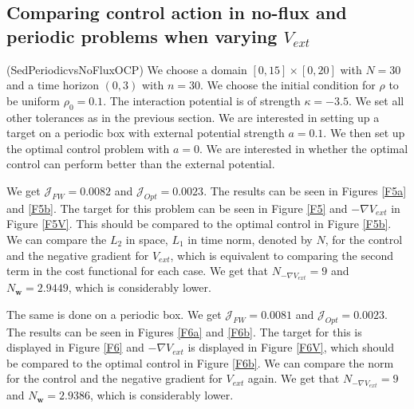 \documentclass[11pt, a4paper]{article}
\theoremstyle{definition}
\newcommand{\w}{\mathbf{w}}
\begin{document}
\subsection{Comparing control action in no-flux and periodic problems when varying $V_{ext}$} \label{sec:PeriodicNoFlux2}
(SedPeriodicvsNoFluxOCP)
We choose a domain $[0,15] \times [0,20]$ with $N = 30$ and a time horizon $(0,3)$ with $n = 30$. We choose the initial condition for $\rho$ to be uniform $\rho_0 = 0.1$. The interaction potential is of strength $\kappa = -3.5$. We set all other tolerances as in the previous section.
We are interested in setting up a target on a periodic box with external potential strength $a = 0.1$. We then set up the optimal control problem with $a =0$. We are interested in whether the optimal control can perform better than the external potential.

We get $\mathcal J_{FW} =  0.0082$ and $\mathcal J_{Opt} =  0.0023$. The results can be seen in Figures \ref{F5a} and \ref{F5b}. The target for this problem can be seen in Figure \ref{F5} and $-\nabla V_{ext}$ in Figure \ref{F5V}. This should be compared to the optimal control in Figure \ref{F5b}. We can compare the $L_2$ in space, $L_1$ in time norm, denoted by $N$, for the control and the negative gradient for $V_{ext}$, which is equivalent to comparing the second term in the cost functional for each case. We get that $N_{-\nabla V_{ext}} = 9$ and $N_{\w} = 2.9449$, which is considerably lower.

The same is done on a periodic box. We get $\mathcal J_{FW} = 0.0081$ and $\mathcal J_{Opt} = 0.0023$. The results can be seen in Figures \ref{F6a} and \ref{F6b}. The target for this is displayed in Figure \ref{F6} and $- \nabla V_{ext}$ is displayed in Figure \ref{F6V}, which should be compared to the optimal control in Figure \ref{F6b}. We can compare the norm for the control and the negative gradient for $V_{ext}$ again. We get that $N_{-\nabla V_{ext}} = 9$ and $N_{\w} = 2.9386$, which is considerably lower.
\end{document}
